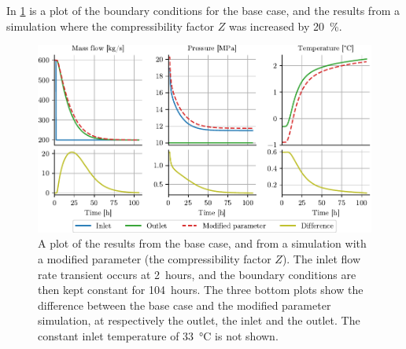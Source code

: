 In \cref{fig:baseCaseWithZ} is a plot of the boundary conditions for the base case, and the results from a simulation where the compressibility factor $Z$ was increased by \SI{20}{\percent}. 
%
%
\begin{figure}[!ht]%
    \centering%
    \includegraphics{figures/base_case_with_adjusted_Z_horiz-with_diff.pdf}%
    \caption{%
        A plot of the results from the base case, and from a simulation with a modified parameter (the compressibility factor $Z$). The inlet flow rate transient occurs at 2~hours, and the boundary conditions are then kept constant for 104~hours. The three bottom plots show the difference between the base case and the modified parameter simulation, at respectively the outlet, the inlet and the outlet. The constant inlet temperature of \SI{33}{\celsius} is not shown.
        \label{fig:baseCaseWithZ}%
    }%
\end{figure}%
